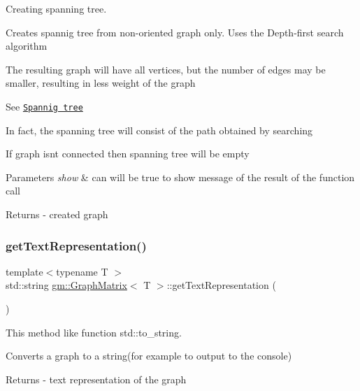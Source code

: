 Creating spanning tree. 

Creates spannig tree from non-\/oriented graph only. Uses the Depth-\/first search algorithm

The resulting graph will have all vertices, but the number of edges may be smaller, resulting in less weight of the graph

See \href{https://en.wikipedia.org/wiki/Spanning_tree}{\tt Spannig tree}

In fact, the spanning tree will consist of the path obtained by searching

If graph isn\textquotesingle{}t connected then spanning tree will be empty 
\begin{DoxyParams}{Parameters}
{\em show} & can will be true to show message of the result of the function call \\
\hline
\end{DoxyParams}
\begin{DoxyReturn}{Returns}
-\/ created graph 
\end{DoxyReturn}
\mbox{\label{classgm_1_1_graph_matrix_a58ac0e38794e668383319945b3c59f08}} 
\subsubsection{\texorpdfstring{get\+Text\+Representation()}{getTextRepresentation()}}
{\footnotesize\ttfamily template$<$typename T $>$ \\
std\+::string \mbox{\hyperlink{classgm_1_1_graph_matrix}{gm\+::\+Graph\+Matrix}}$<$ T $>$\+::get\+Text\+Representation (\begin{DoxyParamCaption}{ }\end{DoxyParamCaption})}



This method like function std\+::to\+\_\+string. 

Converts a graph to a string(for example to output to the console) \begin{DoxyReturn}{Returns}
-\/ text representation of the graph 
\end{DoxyReturn}
\mbox{\label{classgm_1_1_graph_matrix_a8e60714a5f3b6fae8c04be67bbf8b56c}} 
